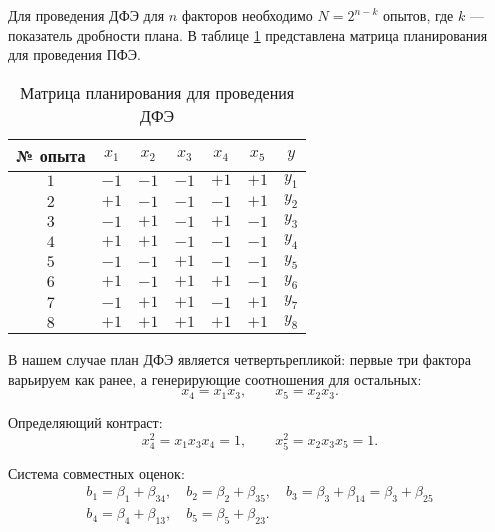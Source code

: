 \documentclass[a4paper, 14pt]{extreport}
\begin{document}
\begin{MainPart}
Для проведения ДФЭ для $n$ факторов необходимо $N = 2^{n - k}$ опытов, где $k$ — показатель дробности плана.
В таблице \ref{tbl:frac-planning-matrix} представлена матрица планирования для проведения ПФЭ.

\begin{table}[hbt!]
	\centering
	\captionsetup{justification=centering}
	\caption{Матрица планирования для проведения ДФЭ}
	\label{tbl:frac-planning-matrix}
	\begin{tabular}{|c|c|c|c|c|c|c|}
		\hline
		№ опыта & $x_1$ & $x_2$ & $x_3$ & $x_4$ & $x_5$ & $y$      \\ \hline
		$1$     & $-1$  & $-1$  & $-1$  & $+1$  & $+1$  & $y_1$    \\ \hline
		$2$     & $+1$  & $-1$  & $-1$  & $-1$  & $+1$  & $y_2$    \\ \hline
		$3$     & $-1$  & $+1$  & $-1$  & $+1$  & $-1$  & $y_3$    \\ \hline
		$4$     & $+1$  & $+1$  & $-1$  & $-1$  & $-1$  & $y_4$    \\ \hline
		$5$     & $-1$  & $-1$  & $+1$  & $-1$  & $-1$  & $y_5$    \\ \hline
		$6$     & $+1$  & $-1$  & $+1$  & $+1$  & $-1$  & $y_6$    \\ \hline
		$7$     & $-1$  & $+1$  & $+1$  & $-1$  & $+1$  & $y_7$    \\ \hline
		$8$     & $+1$  & $+1$  & $+1$  & $+1$  & $+1$  & $y_8$    \\ \hline
	\end{tabular}
\end{table}

В нашем случае план ДФЭ является четвертьрепликой: первые три фактора варьируем как ранее, а генерирующие соотношения для остальных:
\begin{equation}
	x_4 = x_1x_3, \qquad x_5 = x_2x_3.
\end{equation}

Определяющий контраст:
\begin{equation}
	x_4^2 = x_1x_3x_4 = 1, \qquad x_5^2 = x_2x_3x_5 = 1.
\end{equation}

Система совместных оценок:
\begin{gather*}
	b_1 = \beta_1 + \beta_{34}, \quad
	b_2 = \beta_2 + \beta_{35}, \quad
	b_3 = \beta_3 + \beta_{14} = \beta_3 + \beta_{25} \\
	b_4 = \beta_4 + \beta_{13}, \quad
	b_5 = \beta_5 + \beta_{23}.
\end{gather*}


\end{MainPart}
\end{document}

